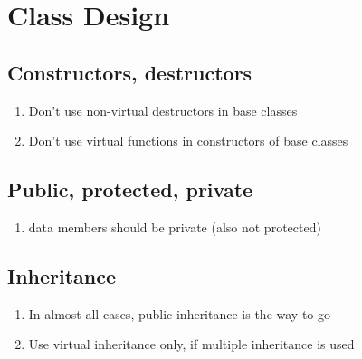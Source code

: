 \section{Class Design}
\subsection{Constructors, destructors}
\begin{enumerate}
\item Don't use non-virtual destructors in base classes
\item Don't use virtual functions in constructors of base classes
\end{enumerate}
\subsection{Public, protected, private}
\begin{enumerate}
\item data members should be private (also not protected)
\end{enumerate}
\subsection{Inheritance}
\begin{enumerate}
\item In almost all cases, public inheritance is the way to go
\item Use virtual inheritance only, if multiple inheritance is used
\end{enumerate}